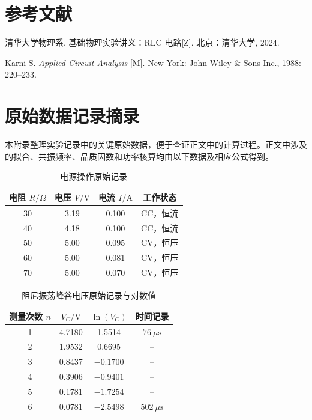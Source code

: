 ﻿\documentclass[UTF8,12pt,a4paper]{ctexart}
\numberwithin{equation}{section}
\begin{document}
\section{参考文献}

\begin{enumerate}[label={[\arabic*]}, leftmargin=2.4em, itemsep=0.4em]
    \item 清华大学物理系. 基础物理实验讲义：RLC 电路[Z]. 北京：清华大学, 2024.
    \item Karni S. \textit{Applied Circuit Analysis} [M]. New York: John Wiley \& Sons Inc., 1988: 220--233.
\end{enumerate}

\appendix
\section{原始数据记录摘录}

本附录整理实验记录中的关键原始数据，便于查证正文中的计算过程。正文中涉及的拟合、共振频率、品质因数和功率核算均由以下数据及相应公式得到。

\begin{table}[H]
\centering
\caption{电源操作原始记录}
\begin{tabular}{cccc}
\toprule
电阻 \(R/\Omega\) & 电压 \(V/\mathrm{V}\) & 电流 \(I/\mathrm{A}\) & 工作状态 \\
\midrule
30 & 3.19 & 0.100 & CC，恒流 \\
40 & 4.18 & 0.100 & CC，恒流 \\
50 & 5.00 & 0.095 & CV，恒压 \\
60 & 5.00 & 0.081 & CV，恒压 \\
70 & 5.00 & 0.070 & CV，恒压 \\
\bottomrule
\end{tabular}
\end{table}

\begin{table}[H]
\centering
\caption{阻尼振荡峰谷电压原始记录与对数值}
\begin{tabular}{cccc}
\toprule
测量次数 \(n\) & \(V_C/\mathrm{V}\) & \(\ln(V_C)\) & 时间记录 \\
\midrule
1 & 4.7180 & 1.5514 & \(76\ \mu\mathrm{s}\) \\
2 & 1.9532 & 0.6695 & -- \\
3 & 0.8437 & \(-0.1700\) & -- \\
4 & 0.3906 & \(-0.9401\) & -- \\
5 & 0.1781 & \(-1.7254\) & -- \\
6 & 0.0781 & \(-2.5498\) & \(502\ \mu\mathrm{s}\) \\
\bottomrule
\end{tabular}
\end{table}
\end{document}

